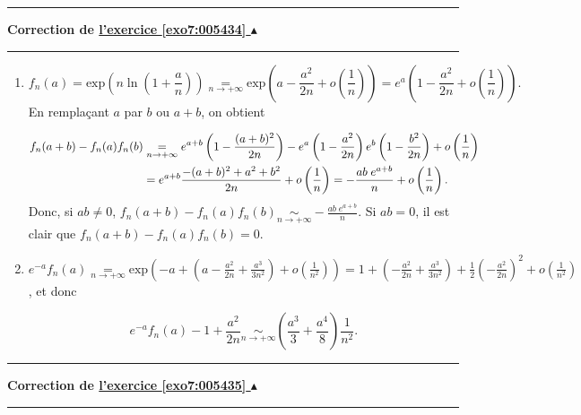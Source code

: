 \documentclass[11pt,a4paper]{article}
\newcounter{exo}
\newcommand{\correction}[1]{\hypertarget{cor7:#1}{}\label{cor7:#1}{\bf Correction de \hyperlink{exo7:#1}{l'exercice \ref{exo7:#1} $\blacktriangle$}}\vspace{1mm}\hrule\vspace{1mm}}
\newcommand{\fincorrection}{\vspace{1mm}\hrule\vspace*{7mm}}
\begin{document}
\fincorrection
\correction{005434}
\begin{enumerate}
 \item  

$$f_n(a)=\text{exp}\left(n\ln\left(1+\frac{a}{n}\right)\right)\underset{n\rightarrow+\infty}{=}\text{exp}\left(a-\frac{a^2}{2n}+o\left(\frac{1}{n}\right)\right)= e^a\left(1-\frac{a^2}{2n}+o\left(\frac{1}{n}\right)\right).$$
En remplaçant $a$ par $b$ ou $a+b$, on obtient

\begin{align*}\ensuremath
f_n(a+b)-f_n(a)f_n(b)&\underset{n\rightarrow+\infty}{=}e^{a+b}\left(1-\frac{(a+b)^2}{2n}\right)-e^a\left(1-\frac{a^2}{2n}\right)e^b\left(1-\frac{b^2}{2n}\right)+o\left(\frac{1}{n}\right)\\
 &=e^{a+b}\frac{-(a+b)^2+a^2+b^2}{2n}+o\left(\frac{1}{n}\right)=-\frac{ab\;e^{a+b}}{n}+o\left(\frac{1}{n}\right).
\end{align*}
Donc, si $ab\neq0$, $f_n(a+b)-f_n(a)f_n(b)\underset{n\rightarrow+\infty}{\sim}-\frac{ab\;e^{a+b}}{n}$. Si $ab=0$, il est clair que $f_n(a+b)-f_n(a)f_n(b)=0$.
 \item  $e^{-a}f_n(a)\underset{n\rightarrow+\infty}{=}\text{exp}\left(-a+\left(a-\frac{a^2}{2n}+\frac{a^3}{3n^2}\right)+o\left(\frac{1}{n^2}\right)\right)
=1+\left(-\frac{a^2}{2n}+\frac{a^3}{3n^2}\right)+\frac{1}{2}\left(-\frac{a^2}{2n}\right)^2+o\left(\frac{1}{n^2}\right)$, et donc

$$e^{-a}f_n(a)-1+\frac{a^2}{2n}\underset{n\rightarrow+\infty}{\sim}\left(\frac{a^3}{3}+\frac{a^4}{8}\right)\frac{1}{n^2}.$$
\end{enumerate}
\fincorrection
\correction{005435}
\end{document}
